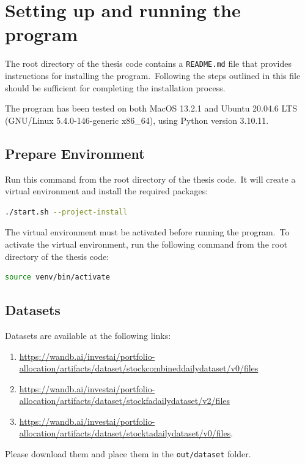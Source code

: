 \documentclass[../xlapes02]{subfiles}
\begin{document}


    \chapter{Setting up and running the program}\label{ch:setting-up-and-running-the-program}
    The root directory of the thesis code contains a \texttt{README.md} file that provides instructions for installing the program.\ Following the steps outlined in this file should be sufficient for completing the installation process.

    The program has been tested on both MacOS 13.2.1 and Ubuntu 20.04.6 LTS (GNU/Linux 5.4.0-146-generic x86\_64), using Python version 3.10.11.


    \section{Prepare Environment}\label{sec:prepare-environment}
    Run this command from the root directory of the thesis code.\ It will create a virtual environment and install the required packages:
    \begin{lstlisting}[language=bash,label={lst:prepare-environment}]
./start.sh --project-install
    \end{lstlisting}

    The virtual environment must be activated before running the program.\ To activate the virtual environment, run the following command from the root directory of the thesis code:
    \begin{lstlisting}[language=bash,label={lst:activate-venv}]
source venv/bin/activate
    \end{lstlisting}


    \section{Datasets}\label{sec:datasets2}
    Datasets are available at the following links:
    \begin{enumerate}
        \item \url{https://wandb.ai/investai/portfolio-allocation/artifacts/dataset/stockcombineddailydataset/v0/files}
        \item \url{https://wandb.ai/investai/portfolio-allocation/artifacts/dataset/stockfadailydataset/v2/files}
        \item \url{https://wandb.ai/investai/portfolio-allocation/artifacts/dataset/stocktadailydataset/v0/files}.
    \end{enumerate}
    Please download them and place them in the \texttt{out/dataset} folder.
\end{document}
